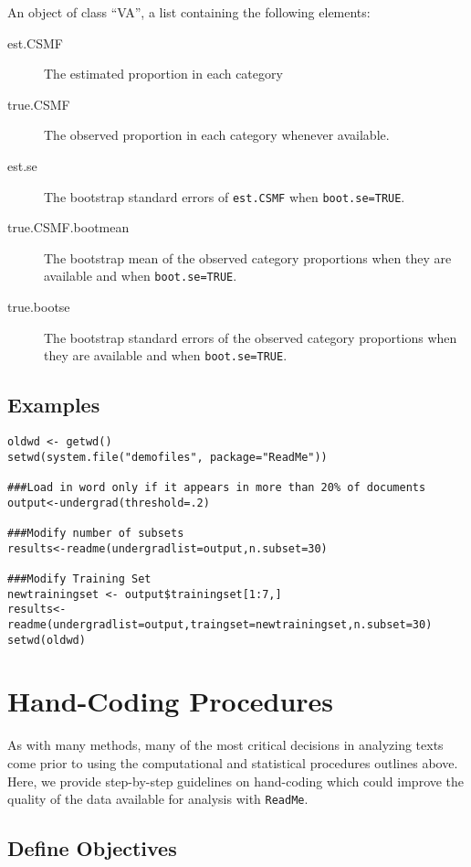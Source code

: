 \documentclass[oneside,letterpaper,titlepage]{article}
\begin{document}
An object of class ``VA'', a list containing the following elements:
\begin{description}
\item[est.CSMF] The estimated proportion in each category
\item[true.CSMF] The observed proportion in each category
  whenever available.
\item[est.se] The bootstrap standard errors of \texttt{est.CSMF} when
  \texttt{boot.se=TRUE}.
\item[true.CSMF.bootmean] The bootstrap mean of the observed
  category proportions when they are available and when
  \texttt{boot.se=TRUE}.
\item[true.bootse] The bootstrap standard errors of the observed
  category proportions when they are available and when
  \texttt{boot.se=TRUE}.
 \end{description}
  
\subsection{Examples}
\begin{verbatim}
oldwd <- getwd()
setwd(system.file("demofiles", package="ReadMe"))

###Load in word only if it appears in more than 20% of documents
output<-undergrad(threshold=.2)

###Modify number of subsets
results<-readme(undergradlist=output,n.subset=30)

###Modify Training Set
newtrainingset <- output$trainingset[1:7,]
results<-readme(undergradlist=output,traingset=newtrainingset,n.subset=30)
setwd(oldwd)
\end{verbatim}

\section{Hand-Coding Procedures}

As with many methods, many of the most critical decisions in analyzing
texts come prior to using the computational and statistical procedures
outlines above.  Here, we provide step-by-step guidelines on
hand-coding which could improve the quality of the data available for
analysis with \texttt{ReadMe}.

\subsection{Define Objectives}
\end{document}
